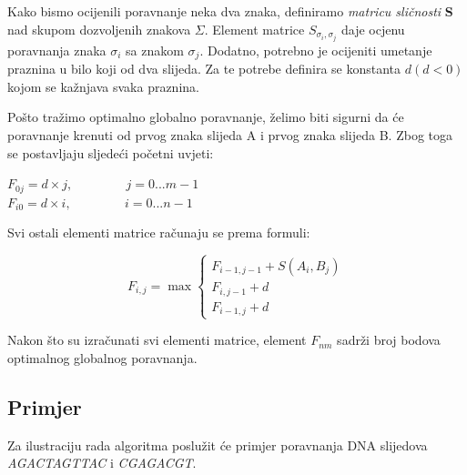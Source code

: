 \documentclass[times, utf8, zavrsni, numeric]{fer}
\begin{document}
Kako bismo ocijenili poravnanje neka dva znaka, definiramo \textit{matricu sličnosti} \textbf{S} nad skupom dozvoljenih znakova $\Sigma$. Element matrice $S_{\sigma_{i}, \sigma_{j}}$ daje ocjenu poravnanja znaka $\sigma_{i}$ sa znakom $\sigma_{j}$. Dodatno, potrebno je ocijeniti umetanje praznina u bilo koji od dva slijeda. Za te potrebe definira se konstanta $d (d < 0)$ kojom se kažnjava svaka praznina.

Pošto tražimo optimalno globalno poravnanje, želimo biti sigurni da će poravnanje krenuti od prvog znaka slijeda A i prvog znaka slijeda B. Zbog toga se postavljaju sljedeći početni uvjeti:
\begin{center}
$F_{0j} = d \times j,\hspace{50pt} j = 0...m - 1$\\
$F_{i0} = d \times i,\hspace{50pt} i = 0...n - 1$
\end{center}
Svi ostali elementi matrice računaju se prema formuli:
\begin{center}
\begin{equation}
F_{i, j} = \max \left\{
	\begin{array}{lr}
		F_{i-1,j-1} + S(A_{i}, B_{j}) \\
		F_{i, j-1} + d \\
		F_{i-1, j} + d
	\end{array}
\right.
\end{equation}
\end{center}

Nakon što su izračunati svi elementi matrice, element $F_{nm}$ sadrži broj bodova optimalnog globalnog poravnanja.

\subsection{Primjer}
\indent

Za ilustraciju rada algoritma poslužit će primjer poravnanja DNA slijedova \emph{AGACTAGTTAC} i \emph{CGAGACGT}.
\end{document}
